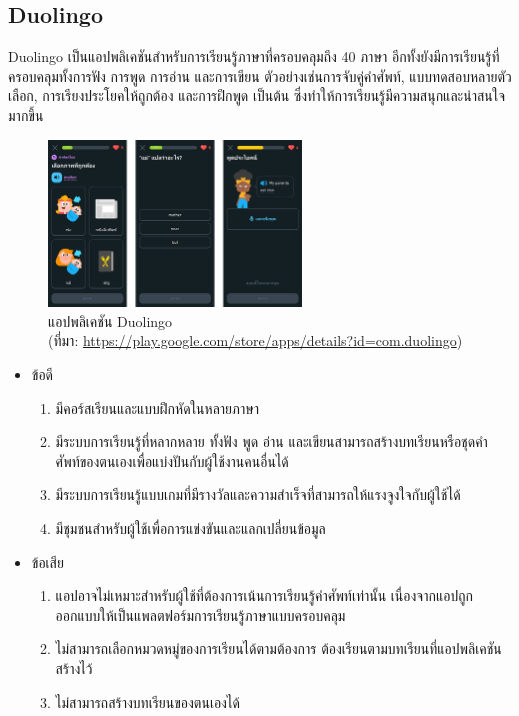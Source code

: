 \documentclass[12pt,oneside,openright,a4paper]{cpe-thai-project}
\begin{document}
\pagebreak
\subsection{Duolingo}

\hspace{1cm}
Duolingo \cite{Duolingo} เป็นแอปพลิเคชันสำหรับการเรียนรู้ภาษาที่ครอบคลุมถึง 40 ภาษา อีกทั้งยังมีการเรียนรู้ที่ครอบคลุมทั้งการฟัง การพูด การอ่าน และการเขียน
ตัวอย่างเช่นการจับคู่คำศัพท์, แบบทดสอบหลายตัวเลือก, การเรียงประโยคให้ถูกต้อง และการฝึกพูด เป็นต้น ซึ่งทำให้การเรียนรู้มีความสนุกและน่าสนใจมากขึ้น

\begin{figure}[!h]\centering
	\includegraphics[width=0.6\textwidth, keepaspectratio=true]{image/chap2/duolingoEX.png}
	\caption[แอปพลิเคชัน Duolingo]{แอปพลิเคชัน Duolingo \\ (ที่มา: \href {https://play.google.com/store/apps/details?id=com.duolingo} {https://play.google.com/store/apps/details?id=com.duolingo})\centering}\label{fig:duolingoEX}
\end{figure}

\begin{itemize}
	\item ข้อดี
	      \begin{enumerate}
		      \item มีคอร์สเรียนและแบบฝึกหัดในหลายภาษา
		      \item มีระบบการเรียนรู้ที่หลากหลาย ทั้งฟัง พูด อ่าน และเขียนสามารถสร้างบทเรียนหรือชุดคำศัพท์ของตนเองเพื่อแบ่งปันกับผู้ใช้งานคนอื่นได้
		      \item มีระบบการเรียนรู้แบบเกมที่มีรางวัลและความสำเร็จที่สามารถให้แรงจูงใจกับผู้ใช้ได้
		      \item มีชุมชนสำหรับผู้ใช้เพื่อการแข่งขันและแลกเปลี่ยนข้อมูล
	      \end{enumerate}
	\item ข้อเสีย
	      \begin{enumerate}
		      \item แอปอาจไม่เหมาะสำหรับผู้ใช้ที่ต้องการเน้นการเรียนรู้คำศัพท์เท่านั้น เนื่องจากแอปถูกออกแบบให้เป็นแพลตฟอร์มการเรียนรู้ภาษาแบบครอบคลุม
		      \item ไม่สามารถเลือกหมวดหมู่ของการเรียนได้ตามต้องการ ต้องเรียนตามบทเรียนที่แอปพลิเคชันสร้างไว้
		      \item ไม่สามารถสร้างบทเรียนของตนเองได้
	      \end{enumerate}
\end{itemize}
\end{document}

